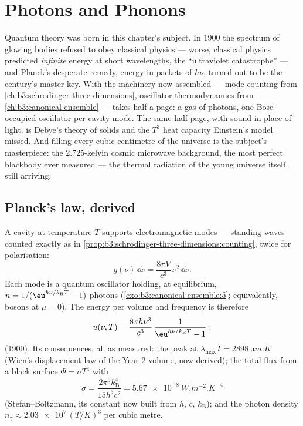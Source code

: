 \chapter{Photons and Phonons}\label{ch:b3:photons-phonons}

Quantum theory was born in this chapter's subject. In 1900 the
spectrum of glowing bodies refused to obey classical physics ---
worse, classical physics predicted \emph{infinite} energy at short
wavelengths, the ``ultraviolet catastrophe'' --- and Planck's
desperate remedy, energy in packets of $h\nu$, turned out to be the
century's master key. With the machinery now assembled --- mode
counting from \cref{ch:b3:schrodinger-three-dimensions}, oscillator
thermodynamics from \cref{ch:b3:canonical-ensemble} --- 
takes half a page: a gas of photons, one Bose-occupied oscillator
per cavity mode. The same half page, with sound in place of light,
is Debye's theory of solids and the $T^3$ heat capacity Einstein's
model missed. And filling every cubic centimetre of the universe is
the subject's masterpiece: the 2.725-kelvin cosmic microwave
background, the most perfect blackbody ever measured --- the
thermal radiation of the young universe itself, still arriving.

\section{Planck's law, derived}

\begin{theorem}\label{thm:b3:photons-phonons:planck}
A cavity at temperature $T$ supports electromagnetic modes ---
standing waves counted exactly as in
\cref{prop:b3:schrodinger-three-dimensions:counting}, twice for
polarisation:
\[
g(\nu)\,\dd\nu = \frac{8\pi V}{c^3}\,\nu^2\,\dd\nu .
\]
Each mode is a quantum oscillator holding, at equilibrium,
$\bar n = 1/(\eu^{h\nu/k_{\text{B}}T} - 1)$ photons
(\cref{exo:b3:canonical-ensemble:5}; equivalently, bosons at $\mu =
0$). The energy per volume and frequency is therefore
\[
u(\nu, T) = \frac{8\pi h\nu^3}{c^3}\,
\frac{1}{\eu^{h\nu/k_{\text{B}}T} - 1} :
\]
\emph{} (1900). Its consequences, all as measured:
the peak at $\lambda_{\max}T = \qty{2898}{\micro m.K}$ (Wien's
displacement law of the Year 2 volume, now derived); the total flux
from a black surface $\Phi = \sigma T^4$ with
\[
\sigma = \frac{2\pi^5k_{\text{B}}^4}{15h^3c^2}
 = \qty{5.67e-8}{W.m^{-2}.K^{-4}}
\]
(Stefan--Boltzmann, its constant now built from $h$, $c$,
$k_{\text{B}}$); and the photon density $n_\gamma \approx
\num{2.03e7}\,(T/\unit{K})^3$ per cubic metre.
\end{theorem}


